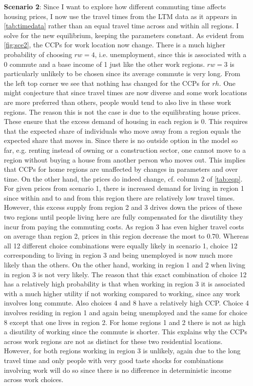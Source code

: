 \textbf{Scenario 2}: Since I want to explore how different commuting time affects housing prices, I now use the travel times from the LTM data as it appears in \autoref{tab:timedata} rather than an equal travel time across and within all regions. I solve for the new equilibrium, keeping the parameters constant. As evident from \autoref{fig:sce2}, the CCPs for work location now change. There is a much higher probability of choosing $rw=4$, i.e. unemployment, since this is associated with a 0 commute and a base income of 1 just like the other work regions. $rw=3$ is particularly unlikely to be chosen since its average commute is very long. From the left top corner we see that nothing has changed for the CCPs for $rh$. One might conjecture that since travel times are now diverse and some work locations are more preferred than others, people would tend to also live in these work regions. The reason this is not the case is due to the equilibrating house prices. These ensure that the excess demand of housing in each region is 0. This requires that the expected share of individuals who move away from a region equals the expected share that moves in. Since there is no outside option in the model so far, e.g. renting instead of owning or a construction sector, one cannot move to a region without buying a house from another person who moves out. This implies that CCPs for home regions are unaffected by changes in parameters and over time. On the other hand, the prices do indeed change, cf. column 2 of \autoref{tab:eqp}. For given prices from scenario 1, there is increased demand for living in region 1 since within and to and from this region there are relatively low travel times. However, this excess supply from region 2 and 3 drives down the prices of these two regions until people living here are fully compensated for the disutility they incur from paying the commuting costs. As region 3 has even higher travel costs on average than region 2, prices in this region decrease the most to 0.70. Whereas all 12 different choice combinations were equally likely in scenario 1, choice 12 corresponding to living in region 3 and being unemployed is now much more likely than the others. On the other hand, working in region 1 and 2 when living in region 3 is not very likely. The reason that this exact combination of choice 12 has a relatively high probability is that when working in region 3 it is associated with a much higher utility if not working compared to working, since any work involves long commute. Also choices 4 and 8 have a relatively high CCP. Choice 4 involves residing in region 1 and again being unemployed and the same for choice 8 except that one lives in region 2. For home regions 1 and 2 there is not as high a disutility of working since the commute is shorter. This explains why the CCPs across work regions are not as distinct for these two residential locations. However, for both regions working in region 3 is unlikely, again due to the long travel time and only people with very good taste shocks for combinations involving work will do so since there is no difference in deterministic income across work choices. 

